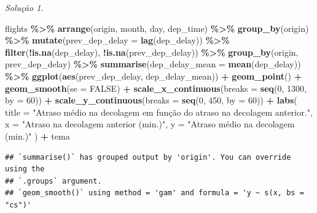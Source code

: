 \documentclass[
]{latex/krantz}
\newenvironment{Shaded}{\begin{snugshade}}{\end{snugshade}}
\newcommand{\AttributeTok}[1]{\textcolor[rgb]{0.13,0.29,0.53}{#1}}
\newcommand{\ConstantTok}[1]{\textcolor[rgb]{0.56,0.35,0.01}{#1}}
\newcommand{\DecValTok}[1]{\textcolor[rgb]{0.00,0.00,0.81}{#1}}
\newcommand{\FunctionTok}[1]{\textcolor[rgb]{0.13,0.29,0.53}{\textbf{#1}}}
\newcommand{\NormalTok}[1]{#1}
\newcommand{\SpecialCharTok}[1]{\textcolor[rgb]{0.81,0.36,0.00}{\textbf{#1}}}
\newcommand{\StringTok}[1]{\textcolor[rgb]{0.31,0.60,0.02}{#1}}
\theoremstyle{definition}
\theoremstyle{definition}
\theoremstyle{definition}
\theoremstyle{definition}
\theoremstyle{remark}
\newtheorem*{solution}{Solução}
\begin{document}
\begin{solution}
\begin{Shaded}
\begin{Highlighting}[]
\NormalTok{flights }\SpecialCharTok{\%\textgreater{}\%}
    \FunctionTok{arrange}\NormalTok{(origin, month, day, dep\_time) }\SpecialCharTok{\%\textgreater{}\%}
    \FunctionTok{group\_by}\NormalTok{(origin) }\SpecialCharTok{\%\textgreater{}\%}
    \FunctionTok{mutate}\NormalTok{(}\AttributeTok{prev\_dep\_delay =} \FunctionTok{lag}\NormalTok{(dep\_delay)) }\SpecialCharTok{\%\textgreater{}\%}
    \FunctionTok{filter}\NormalTok{(}\SpecialCharTok{!}\FunctionTok{is.na}\NormalTok{(dep\_delay), }\SpecialCharTok{!}\FunctionTok{is.na}\NormalTok{(prev\_dep\_delay)) }\SpecialCharTok{\%\textgreater{}\%}
    \FunctionTok{group\_by}\NormalTok{(origin, prev\_dep\_delay) }\SpecialCharTok{\%\textgreater{}\%}
    \FunctionTok{summarise}\NormalTok{(}\AttributeTok{dep\_delay\_mean =} \FunctionTok{mean}\NormalTok{(dep\_delay)) }\SpecialCharTok{\%\textgreater{}\%}
    \FunctionTok{ggplot}\NormalTok{(}\FunctionTok{aes}\NormalTok{(prev\_dep\_delay, dep\_delay\_mean)) }\SpecialCharTok{+}
        \FunctionTok{geom\_point}\NormalTok{() }\SpecialCharTok{+}
        \FunctionTok{geom\_smooth}\NormalTok{(}\AttributeTok{se =} \ConstantTok{FALSE}\NormalTok{) }\SpecialCharTok{+}        
        \FunctionTok{scale\_x\_continuous}\NormalTok{(}\AttributeTok{breaks =} \FunctionTok{seq}\NormalTok{(}\DecValTok{0}\NormalTok{, }\DecValTok{1300}\NormalTok{, }\AttributeTok{by =} \DecValTok{60}\NormalTok{)) }\SpecialCharTok{+}
        \FunctionTok{scale\_y\_continuous}\NormalTok{(}\AttributeTok{breaks =} \FunctionTok{seq}\NormalTok{(}\DecValTok{0}\NormalTok{, }\DecValTok{450}\NormalTok{, }\AttributeTok{by =} \DecValTok{60}\NormalTok{)) }\SpecialCharTok{+}
        \FunctionTok{labs}\NormalTok{(}
            \AttributeTok{title =} \StringTok{"Atraso médio na decolagem em função do atraso na decolagem anterior."}\NormalTok{,}
            \AttributeTok{x =} \StringTok{"Atraso na decolagem anterior (min.)"}\NormalTok{,}
            \AttributeTok{y =} \StringTok{"Atraso médio na decolagem (min.)"}
\NormalTok{        ) }\SpecialCharTok{+}
\NormalTok{        tema}
\end{Highlighting}
\end{Shaded}

\begin{verbatim}
## `summarise()` has grouped output by 'origin'. You can override using the
## `.groups` argument.
## `geom_smooth()` using method = 'gam' and formula = 'y ~ s(x, bs = "cs")'
\end{verbatim}


\end{solution}
\end{document}
